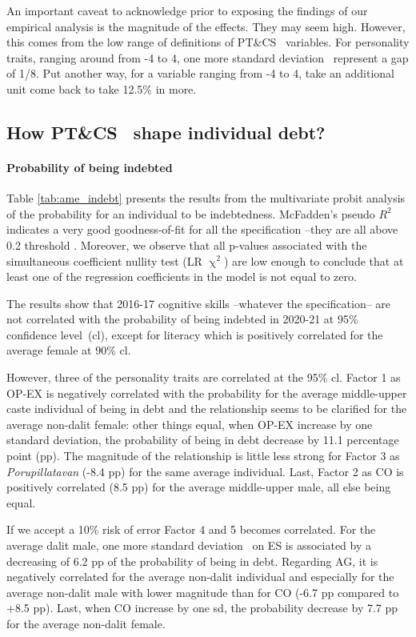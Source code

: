 \documentclass[a4paper, 11pt, onecolumn]{article}
\newcommand{\sd}{standard deviation}
\newcommand{\aebe}{all else being equal}
\newcommand{\ote}{other things equal}
\newcommand{\cl}{confidence level}
\newcommand{\PTCS}{PT\&CS}
\begin{document}
An important caveat to acknowledge prior to exposing the findings of our empirical analysis is the magnitude of the effects.
They may seem high. 
However, this comes from the low range of definitions of \PTCS~ variables.
For personality traits, ranging around from -4 to 4, one more \sd~ represent a gap of 1/8.
Put another way, for a variable ranging from -4 to 4, take an additional unit come back to take 12.5\% in more.


	\subsection{How \PTCS~ shape individual debt?}

\paragraph{Probability of being indebted}
Table \ref{tab:ame_indebt} presents the results from the multivariate probit analysis of the probability for an individual to be indebtedness.
McFadden's pseudo $R^2$ indicates a very good goodness-of-fit for all the specification --they are all above 0.2 threshold \citep{McFadden1979}.
Moreover, we observe that all p-values associated with the simultaneous coefficient nullity test (LR $\upchi^2$) are low enough to conclude that at least one of the regression coefficients in the model is not equal to zero.

The results show that 2016-17 cognitive skills --whatever the specification-- are not correlated with the probability of being indebted in 2020-21 at 95\% \cl~(cl), except for literacy which is positively correlated for the average female at 90\% cl.

However, three of the personality traits are correlated at the 95\% cl. 
Factor 1 as OP-EX is negatively correlated with the probability for the average middle-upper caste individual of being in debt and the relationship seems to be clarified for the average non-dalit female: \ote, when OP-EX increase by one \sd, the probability of being in debt decrease by 11.1 percentage point (pp).
The magnitude of the relationship is little less strong for Factor 3 as \textit{Porupillatavan} (-8.4 pp) for the same average individual. 
Last, Factor 2 as CO is positively correlated (8.5 pp) for the average middle-upper male, \aebe.

If we accept a 10\% risk of error Factor 4 and 5 becomes correlated.
For the average dalit male, one more \sd~ on ES is associated by a decreasing of 6.2 pp of the probability of being in debt.
Regarding AG, it is negatively correlated for the average non-dalit individual and especially for the average non-dalit male with lower magnitude than for CO (-6.7 pp compared to +8.5 pp).
Last, when CO increase by one sd, the probability decrease by 7.7 pp for the average non-dalit female.
\end{document}
